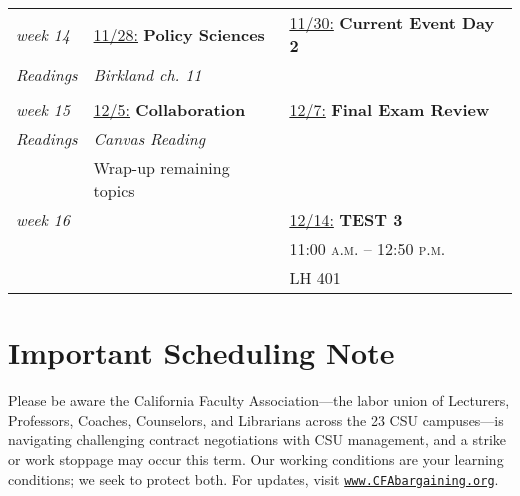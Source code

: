 \documentclass[12pt, letterpaper]{article}
\begin{document}
\begin{center}
\begin{longtable}{p{2cm} | p{6.8cm} | p{6.8cm}}
	\emph{week 14} 	& \underline{11/28:} \textbf{Policy Sciences}	 		& \underline{11/30:} \textbf{Current Event Day 2}	\\
	\emph{Readings}	& \textit{Birkland ch. 11}								& 													\\
					& 														& 													\\ \hline	
	
	\emph{week 15}	& \underline{12/5:} \textbf{Collaboration}				& \underline{12/7:} \textbf{Final Exam Review}		\\
	\emph{Readings}	& \textit{Canvas Reading} 								& 					 								\\
					& Wrap-up remaining topics								&													\\ \hline	
					
	\emph{week 16} &														& \underline{12/14:} \textbf{TEST 3}				\\
				   &														& 11:00 \textsc{a.m.} -- 12:50 \textsc{p.m.}		\\
				   &														& LH 401											\\ \hline
					
	
\end{longtable}
\end{center}

\section*{Important Scheduling Note}

Please be aware the California Faculty Association---the labor union of Lecturers, Professors, Coaches, Counselors, and Librarians across the 23 CSU campuses---is navigating challenging contract negotiations with CSU management, and a strike or work stoppage may occur this term. Our working conditions are your learning conditions; we seek to protect both. For updates, visit \href{www.CFAbargaining.org}{\texttt{www.CFAbargaining.org}}.
\end{document}
